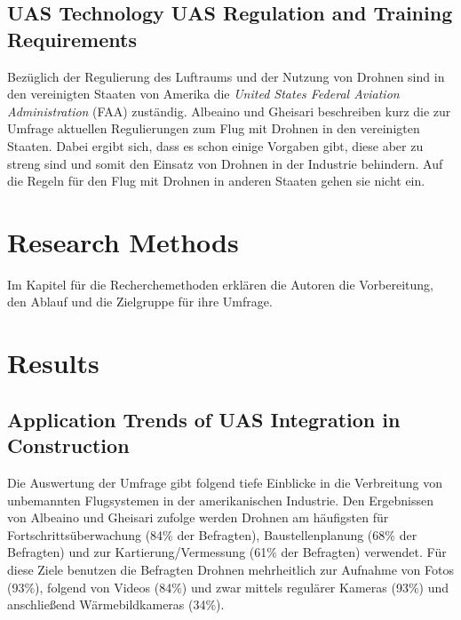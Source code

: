 \subsection{UAS Technology UAS Regulation and Training Requirements}
Bezüglich der Regulierung des Luftraums und der Nutzung von Drohnen sind in den vereinigten Staaten von Amerika die \textit{United States Federal Aviation Administration} (FAA) zuständig.
Albeaino und Gheisari beschreiben kurz die zur Umfrage aktuellen Regulierungen zum Flug mit Drohnen in den vereinigten Staaten.
Dabei ergibt sich, dass es schon einige Vorgaben gibt, diese aber zu streng sind und somit den Einsatz von Drohnen in der Industrie behindern.
Auf die Regeln für den Flug mit Drohnen in anderen Staaten gehen sie nicht ein. \cite[S. 92]{abaeano2021trends}

\section{Research Methods}
Im Kapitel für die Recherchemethoden erklären die Autoren die Vorbereitung, den Ablauf und die Zielgruppe für ihre Umfrage. \cite[S. 93]{abaeano2021trends}

\section{Results}
\subsection{Application Trends of UAS Integration in Construction}


Die Auswertung der Umfrage gibt folgend tiefe Einblicke in die Verbreitung von unbemannten Flugsystemen in der amerikanischen Industrie.
Den Ergebnissen von Albeaino und Gheisari zufolge werden Drohnen am häufigsten für Fortschrittsüberwachung (84\% der Befragten), Baustellenplanung (68\% der Befragten) und zur Kartierung/Vermessung (61\% der Befragten) verwendet.
Für diese Ziele benutzen die Befragten Drohnen mehrheitlich zur Aufnahme von Fotos (93\%), folgend von Videos (84\%) und zwar mittels regulärer Kameras (93\%) und anschließend Wärmebildkameras (34\%). \cite[S. 95--97]{abaeano2021trends}

